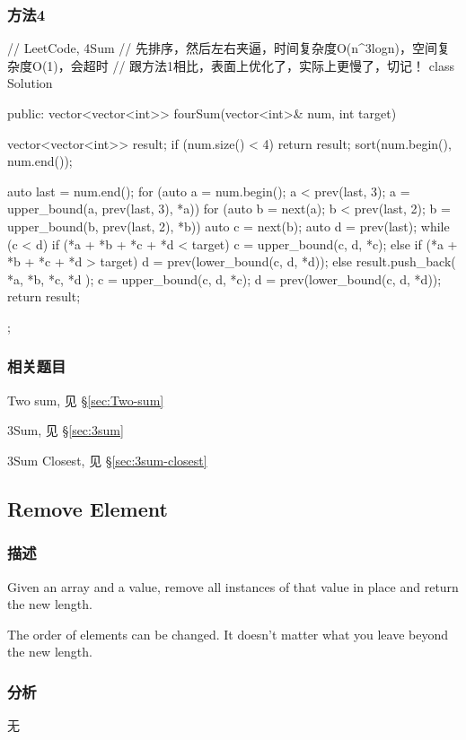 \subsubsection{方法4}
\begin{Code}
	// LeetCode, 4Sum
	// 先排序，然后左右夹逼，时间复杂度O(n^3logn)，空间复杂度O(1)，会超时
	// 跟方法1相比，表面上优化了，实际上更慢了，切记！
	class Solution {
		public:
		vector<vector<int>> fourSum(vector<int>& num, int target) {
			vector<vector<int>> result;
			if (num.size() < 4) return result;
			sort(num.begin(), num.end());
			
			auto last = num.end();
			for (auto a = num.begin(); a < prev(last, 3);
			a = upper_bound(a, prev(last, 3), *a)) {
				for (auto b = next(a); b < prev(last, 2);
				b = upper_bound(b, prev(last, 2), *b)) {
					auto c = next(b);
					auto d = prev(last);
					while (c < d) {
						if (*a + *b + *c + *d < target) {
							c = upper_bound(c, d, *c);
						} else if (*a + *b + *c + *d > target) {
						d = prev(lower_bound(c, d, *d));
					} else {
					result.push_back({ *a, *b, *c, *d });
					c = upper_bound(c, d, *c);
					d = prev(lower_bound(c, d, *d));
				}
			}
		}
	}
	return result;
}
};
\end{Code}


\subsubsection{相关题目}
\begindot
\item Two sum, 见 \S \ref{sec:Two-sum}
\item 3Sum, 见 \S \ref{sec:3sum}
\item 3Sum Closest, 见 \S \ref{sec:3sum-closest}
\myenddot


\subsection{Remove Element} %
\label{sec:remove-element }


\subsubsection{描述}
Given an array and a value, remove all instances of that value in place and 
return the new length.

The order of elements can be changed. It doesn't matter what you leave beyond 
the new length.


\subsubsection{分析}
无


